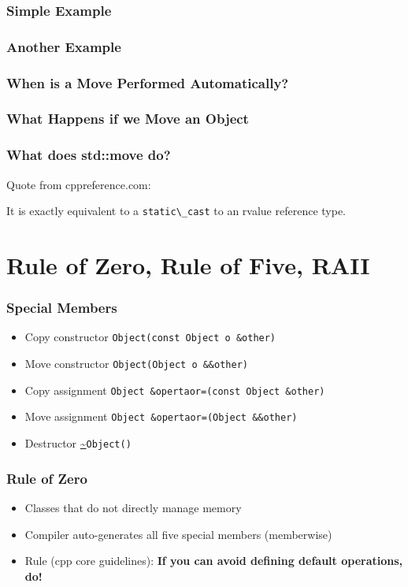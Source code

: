 \documentclass[usenames,dvipsnames,svgnames,table,aspectratio=169]{beamer}
\begin{document}
\begin{frame}
    \frametitle{Simple Example}
    
\end{frame}

\begin{frame}
    \frametitle{Another Example}
    
\end{frame}

\begin{frame}
    \frametitle{When is a Move Performed Automatically?}
    
\end{frame}

\begin{frame}
    \frametitle{What Happens if we Move an Object}
    
\end{frame}

\begin{frame}
    \frametitle{What does std::move do?}
    Quote from cppreference.com:
    
    It is exactly equivalent to a \lstinline|static\_cast| to an rvalue reference type. 
    \pause
    
\end{frame}

\section{Rule of Zero, Rule of Five, RAII}

\begin{frame}
    \frametitle{Special Members}
    \begin{itemize}
        \item<+-> Copy constructor \lstinline{Object(const Object o &other)}
        \item<+-> Move constructor \lstinline{Object(Object o &&other)}
        \item<+-> Copy assignment \lstinline{Object &opertaor=(const Object &other)}
        \item<+-> Move assignment \lstinline{Object &opertaor=(Object &&other)}
        \item<+-> Destructor \url{~}\lstinline{Object()}
    \end{itemize}
\end{frame}

\begin{frame}
    \frametitle{Rule of Zero}
    \begin{itemize}
        \item<+-> Classes that do not directly manage memory
        \item<+-> Compiler auto-generates all five special members (memberwise)
        \item<+-> Rule (cpp core guidelines): \textbf{If you can avoid defining default operations, do!}
    \end{itemize}
    \only<+->{}
\end{frame}
\end{document}
